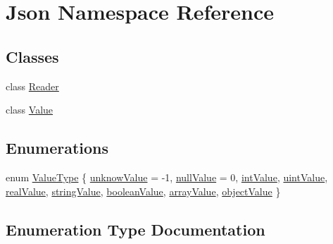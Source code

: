 \hypertarget{namespace_json}{}\section{Json Namespace Reference}
\label{namespace_json}
\subsection*{Classes}
\begin{DoxyCompactItemize}
\item 
class \hyperlink{class_json_1_1_reader}{Reader}
\item 
class \hyperlink{class_json_1_1_value}{Value}
\end{DoxyCompactItemize}
\subsection*{Enumerations}
\begin{DoxyCompactItemize}
\item 
enum \hyperlink{namespace_json_a7d654b75c16a57007925868e38212b4e}{Value\+Type} \{ \newline
\hyperlink{namespace_json_a7d654b75c16a57007925868e38212b4eaf3bec0dbeafa6b0fdc48db16179b6369}{unknow\+Value} = -\/1, 
\hyperlink{namespace_json_a7d654b75c16a57007925868e38212b4ea7d9899633b4409bd3fc107e6737f8391}{null\+Value} = 0, 
\hyperlink{namespace_json_a7d654b75c16a57007925868e38212b4eae5a9d708d5c9e23ae9bf98898522512d}{int\+Value}, 
\hyperlink{namespace_json_a7d654b75c16a57007925868e38212b4eaea788d9a3bb00adc6d68d97d43e1ccd3}{uint\+Value}, 
\newline
\hyperlink{namespace_json_a7d654b75c16a57007925868e38212b4eab837c7b869c14d8be712deb45c9e490e}{real\+Value}, 
\hyperlink{namespace_json_a7d654b75c16a57007925868e38212b4ea804ef857affea2d415843c73f261c258}{string\+Value}, 
\hyperlink{namespace_json_a7d654b75c16a57007925868e38212b4ea14c30dbf4da86f7b809be299f671f7fd}{boolean\+Value}, 
\hyperlink{namespace_json_a7d654b75c16a57007925868e38212b4eadc8f264f36b55b063c78126b335415f4}{array\+Value}, 
\newline
\hyperlink{namespace_json_a7d654b75c16a57007925868e38212b4eae8386dcfc36d1ae897745f7b4f77a1f6}{object\+Value}
 \}
\end{DoxyCompactItemize}


\subsection{Enumeration Type Documentation}
\mbox{\label{namespace_json_a7d654b75c16a57007925868e38212b4e}} 
